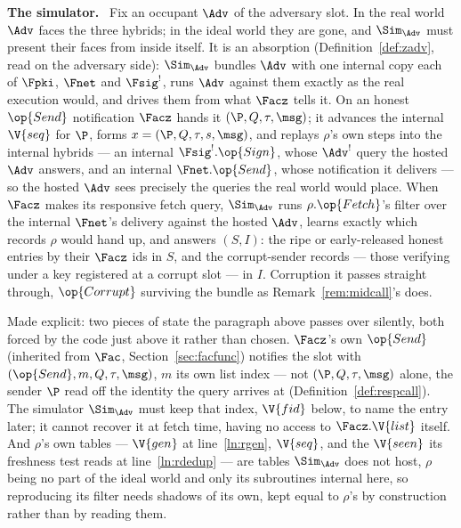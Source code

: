 \documentclass[10pt,oneside,openany]{book}
\newcommand{\heading}[1]{\medskip\par\noindent\textcolor{accent}{\textbf{#1.}}\ }
\theoremstyle{accentdef}
\theoremstyle{accentplain}
\begin{document}
\heading{The simulator} Fix an occupant $\Adv$ of the adversary slot. In the real world $\Adv$
faces the three hybrids; in the ideal world they are gone, and $\Sim_{\Adv}$ must present their
faces from inside itself. It is an absorption (Definition~\ref{def:zadv}, read on the adversary
side): $\Sim_{\Adv}$ bundles $\Adv$ with one internal copy each of $\Fpki$, $\Fnet$ and
$\Fsig^{!}$, runs $\Adv$ against them exactly as the real execution would, and drives them from
what $\Facz$ tells it. On an honest $\op{Send}$ notification $\Facz$ hands it $(\P,Q,\tau,\msg)$;
it advances the internal $\V{seq}$ for $\P$, forms $x = (\P,Q,\tau,s,\msg)$, and replays $\rho$'s
own steps into the internal hybrids --- an internal $\Fsig^{!}.\op{Sign}$, whose $\Adv^{!}$ query
the hosted $\Adv$ answers, and an internal $\Fnet.\op{Send}$, whose notification it delivers ---
so the hosted $\Adv$ sees precisely the queries the real world would place. When $\Facz$ makes its
responsive fetch query, $\Sim_{\Adv}$ runs $\rho.\op{Fetch}$'s filter over the internal $\Fnet$'s
delivery against the hosted $\Adv$, learns exactly which records $\rho$ would hand up, and answers
$(S,I)$: the ripe or early-released honest entries by their $\Facz$ ids in $S$, and the
corrupt-sender records --- those verifying under a key registered at a corrupt slot --- in $I$.
Corruption it passes straight through, $\op{Corrupt}$ surviving the bundle as
Remark~\ref{rem:midcall}'s does.

Made explicit: two pieces of state the paragraph above passes over silently, both forced by the
code just above it rather than chosen. $\Facz$'s own $\op{Send}$ (inherited from $\Fac$,
Section~\ref{sec:facfunc}) notifies the slot with $(\op{Send},m,Q,\tau,\msg)$, $m$ its own list
index --- not $(\P,Q,\tau,\msg)$ alone, the sender $\P$ read off the identity the query arrives at
(Definition~\ref{def:respcall}). The simulator $\Sim_{\Adv}$ must keep that index, $\V{fid}$ below, to name the
entry later; it cannot recover it at fetch time, having no access to $\Facz.\V{list}$ itself.
And $\rho$'s own tables --- $\V{gen}$ at line~\ref{ln:rgen}, $\V{seq}$, and the $\V{seen}$ its
freshness test reads at line~\ref{ln:rdedup} --- are tables $\Sim_{\Adv}$ does not host, $\rho$
being no part of the ideal world and only its subroutines internal here, so reproducing its
filter needs shadows of its own, kept equal to $\rho$'s by construction rather than by reading
them.
\end{document}
